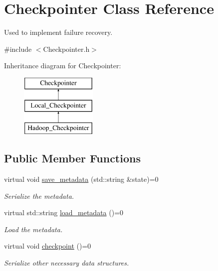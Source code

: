 \hypertarget{class_checkpointer}{
\section{Checkpointer Class Reference}
\label{class_checkpointer}
}


Used to implement failure recovery.  




{\ttfamily \#include $<$Checkpointer.h$>$}

Inheritance diagram for Checkpointer:\begin{figure}[H]
\begin{center}
\leavevmode
\includegraphics[height=3cm]{class_checkpointer}
\end{center}
\end{figure}
\subsection*{Public Member Functions}
\begin{DoxyCompactItemize}
\item 
virtual void \hyperlink{class_checkpointer_a2dd3cfe87847c8e3d1dac001c8d75a8c}{save\_\-metadata} (std::string \&state)=0
\begin{DoxyCompactList}\small\item\em Serialize the metadata. \item\end{DoxyCompactList}\item 
virtual std::string \hyperlink{class_checkpointer_ab3823bbe8bab653084697af29296323d}{load\_\-metadata} ()=0
\begin{DoxyCompactList}\small\item\em Load the metadata. \item\end{DoxyCompactList}\item 
virtual void \hyperlink{class_checkpointer_a7a0f2b3220292d7a3be972776ea8f2d3}{checkpoint} ()=0
\begin{DoxyCompactList}\small\item\em Serialize other necessary data structures. \item\end{DoxyCompactList}\end{DoxyCompactItemize}


